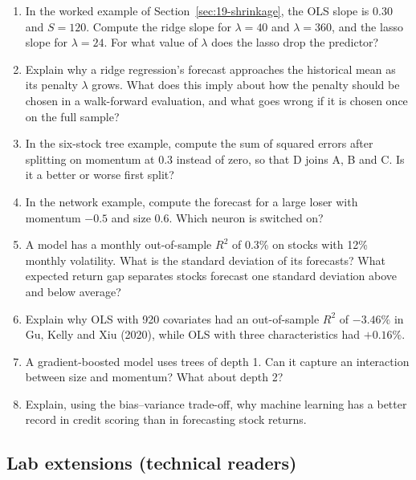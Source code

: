 \begin{enumerate}
  \item In the worked example of Section~\ref{sec:19-shrinkage}, the OLS slope is 0.30 and $S = 120$. Compute the ridge slope for $\lambda = 40$ and $\lambda = 360$, and the lasso slope for $\lambda = 24$. For what value of $\lambda$ does the lasso drop the predictor?
  \item Explain why a ridge regression's forecast approaches the historical mean as its penalty $\lambda$ grows. What does this imply about how the penalty should be chosen in a walk-forward evaluation, and what goes wrong if it is chosen once on the full sample?
  \item In the six-stock tree example, compute the sum of squared errors after splitting on momentum at $0.3$ instead of zero, so that D joins A, B and C. Is it a better or worse first split?
  \item In the network example, compute the forecast for a large loser with momentum $-0.5$ and size $0.6$. Which neuron is switched on?
  \item A model has a monthly out-of-sample $R^2$ of 0.3\% on stocks with 12\% monthly volatility. What is the standard deviation of its forecasts? What expected return gap separates stocks forecast one standard deviation above and below average?
  \item Explain why OLS with 920 covariates had an out-of-sample $R^2$ of $-3.46\%$ in Gu, Kelly and Xiu (2020), while OLS with three characteristics had $+0.16\%$.
  \item A gradient-boosted model uses trees of depth 1. Can it capture an interaction between size and momentum? What about depth 2?
  \item Explain, using the bias--variance trade-off, why machine learning has a better record in credit scoring than in forecasting stock returns.
\end{enumerate}

\subsection*{Lab extensions (technical readers)}

